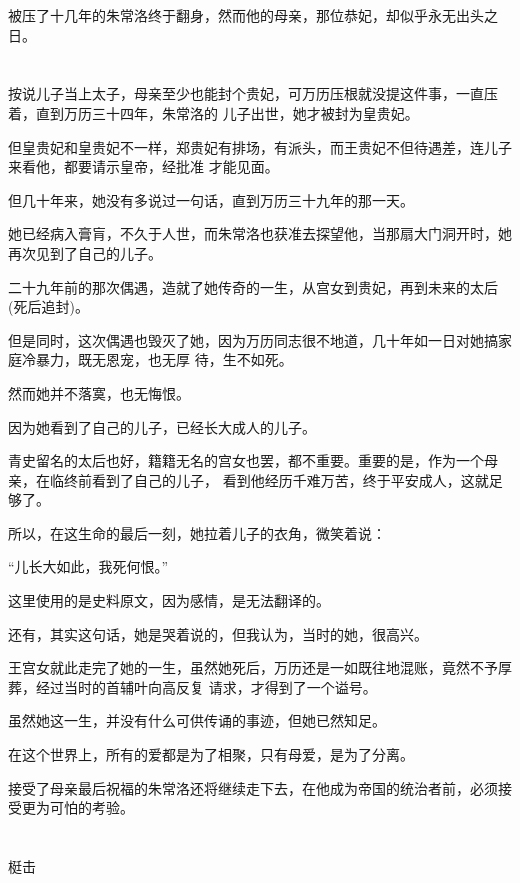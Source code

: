 \documentclass[11pt,a4paper,onecolumn]{article}
\begin{document}
被压了十几年的朱常洛终于翻身，然而他的母亲，那位恭妃，却似乎永无出头之日。

\section[\thesection]{}

按说儿子当上太子，母亲至少也能封个贵妃，可万历压根就没提这件事，一直压着，直到万历三十四年，朱常洛的
儿子出世，她才被封为皇贵妃。

但皇贵妃和皇贵妃不一样，郑贵妃有排场，有派头，而王贵妃不但待遇差，连儿子来看他，都要请示皇帝，经批准
才能见面。

但几十年来，她没有多说过一句话，直到万历三十九年的那一天。

她已经病入膏肓，不久于人世，而朱常洛也获准去探望他，当那扇大门洞开时，她再次见到了自己的儿子。

二十九年前的那次偶遇，造就了她传奇的一生，从宫女到贵妃，再到未来的太后(死后追封)。

但是同时，这次偶遇也毁灭了她，因为万历同志很不地道，几十年如一日对她搞家庭冷暴力，既无恩宠，也无厚
待，生不如死。

然而她并不落寞，也无悔恨。

因为她看到了自己的儿子，已经长大成人的儿子。

青史留名的太后也好，籍籍无名的宫女也罢，都不重要。重要的是，作为一个母亲，在临终前看到了自己的儿子，
看到他经历千难万苦，终于平安成人，这就足够了。

所以，在这生命的最后一刻，她拉着儿子的衣角，微笑着说：

``儿长大如此，我死何恨。''

这里使用的是史料原文，因为感情，是无法翻译的。

还有，其实这句话，她是哭着说的，但我认为，当时的她，很高兴。

王宫女就此走完了她的一生，虽然她死后，万历还是一如既往地混账，竟然不予厚葬，经过当时的首辅叶向高反复
请求，才得到了一个谥号。

虽然她这一生，并没有什么可供传诵的事迹，但她已然知足。

在这个世界上，所有的爱都是为了相聚，只有母爱，是为了分离。

接受了母亲最后祝福的朱常洛还将继续走下去，在他成为帝国的统治者前，必须接受更为可怕的考验。

\section[\thesection]{}

梃击
\end{document}
